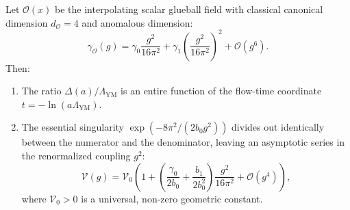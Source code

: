 \begin{theorem}
\label{thm:value_factor_analyticity}
Let $\mathcal{O}(x)$ be the interpolating scalar glueball field with classical canonical dimension $d_{\mathcal{O}} = 4$ and anomalous dimension:
\begin{equation}
\label{eq:ch9_gamma_expansion}
\gamma_{\mathcal{O}}(g) = \gamma_0 \frac{g^2}{16\pi^2} + \gamma_1 \left( \frac{g^2}{16\pi^2} \right)^2 + \mathcal{O}(g^6).
\end{equation}
Then:
\begin{enumerate}
    \item The ratio $\Delta(a) / \Lambda_{\mathrm{YM}}$ is an entire function of the flow-time coordinate $t = -\ln(a \Lambda_{\mathrm{YM}})$.
    \item The essential singularity $\exp(-8\pi^2/(2b_0 g^2))$ divides out identically between the numerator and the denominator, leaving an asymptotic series in the renormalized coupling $g^2$:
    \begin{equation}
    \label{eq:value_factor_expansion}
    \mathcal{V}(g) = \mathcal{V}_0 \left( 1 + \left( \frac{\gamma_0}{2b_0} + \frac{b_1}{2b_0^2} \right) \frac{g^2}{16\pi^2} + \mathcal{O}(g^4) \right),
    \end{equation}
    where $\mathcal{V}_0 > 0$ is a universal, non-zero geometric constant.
\end{enumerate}
\end{theorem}

